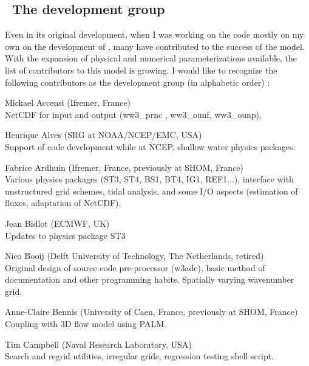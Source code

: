 \vssub
\subsection{~The development group}
\vssub

Even in its original development, when I was working on the code mostly on my
own on the development of \ws, many have contributed to the success of the
model. With the expansion of physical and numerical parameterizations
available, the list of contributors to this model is growing. I would like to
recognize the following contributors as the development group (in alphabetic
order) :

\begin{list}{\ldots}{ }

\item [Mickael Accensi] (Ifremer, France) \\
  NetCDF for input and output (ww3\_prnc , ww3\_ounf, ww3\_ounp).

\item [Henrique Alves] (SRG  at NOAA/NCEP/EMC, USA) \\
  Support of code development while at NCEP, shallow water physics packages.

\item [Fabrice Ardhuin] (Ifremer, France, previously at SHOM, France) \\
  Various physics packages (ST3, ST4, BS1, BT4, IG1, REF1...), interface with unstructured grid schemes, tidal analysis, and some I/O aspects (estimation of fluxes, adaptation of NetCDF). 

\item [Jean Bidlot] (ECMWF, UK) \\
  Updates to physics package ST3

\item [Nico Booij] (Delft University of Technology, The Netherlands, retired) \\
  Original design of source code pre-processor ({\code w3adc}), basic method
  of documentation and other programming habits. Spatially varying wavenumber
  grid.

\item [Anne-Claire Bennis] (University of Caen, France, previously at SHOM, France) \\
  Coupling with 3D flow model using PALM.

\item [Tim Campbell] (Naval Research Laboratory, USA)\\ 
  Search and regrid utilities, irregular grids, regression testing
  shell script.


\end{list}
